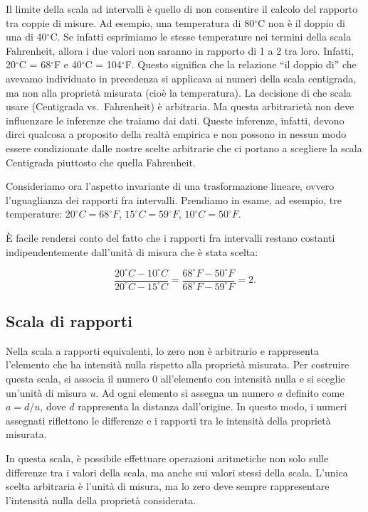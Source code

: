 \documentclass[
  letterpaper,
  krantz2]{{[}./krantz{]}}
\begin{document}
Il limite della scala ad intervalli è quello di non consentire il
calcolo del rapporto tra coppie di misure. Ad esempio, una temperatura
di 80\(^\circ\)C non è il doppio di una di 40\(^\circ\)C. Se infatti
esprimiamo le stesse temperature nei termini della scala Fahrenheit,
allora i due valori non saranno in rapporto di 1 a 2 tra loro. Infatti,
20\(^\circ\)C = 68\(^\circ\)F e 40\(^\circ\)C = 104\(^\circ\)F. Questo
significa che la relazione ``il doppio di'' che avevamo individuato in
precedenza si applicava ai numeri della scala centigrada, ma non alla
proprietà misurata (cioè la temperatura). La decisione di che scala
usare (Centigrada vs.~Fahrenheit) è arbitraria. Ma questa arbitrarietà
non deve influenzare le inferenze che traiamo dai dati. Queste
inferenze, infatti, devono dirci qualcosa a proposito della realtà
empirica e non possono in nessun modo essere condizionate dalle nostre
scelte arbitrarie che ci portano a scegliere la scala Centigrada
piuttosto che quella Fahrenheit.

Consideriamo ora l'aspetto invariante di una trasformazione lineare,
ovvero l'uguaglianza dei rapporti fra intervalli. Prendiamo in esame, ad
esempio, tre temperature: \(20^\circ C = 68^\circ F\),
\(15^\circ C = 59^\circ F\), \(10^\circ C = 50 ^\circ F\).

È facile rendersi conto del fatto che i rapporti fra intervalli restano
costanti indipendentemente dall'unità di misura che è stata scelta:

\[
  \frac{20^\circ C - 10^\circ C}{20^\circ C - 15^\circ C} =
  \frac{68^\circ F - 50^\circ F}{68^\circ F-59^\circ F} = 2.
\]

\subsection{Scala di rapporti}\label{scala-di-rapporti}

Nella scala a rapporti equivalenti, lo zero non è arbitrario e
rappresenta l'elemento che ha intensità nulla rispetto alla proprietà
misurata. Per costruire questa scala, si associa il numero 0
all'elemento con intensità nulla e si sceglie un'unità di misura \(u\).
Ad ogni elemento si assegna un numero \(a\) definito come \(a=d/u\),
dove \(d\) rappresenta la distanza dall'origine. In questo modo, i
numeri assegnati riflettono le differenze e i rapporti tra le intensità
della proprietà misurata.

In questa scala, è possibile effettuare operazioni aritmetiche non solo
sulle differenze tra i valori della scala, ma anche sui valori stessi
della scala. L'unica scelta arbitraria è l'unità di misura, ma lo zero
deve sempre rappresentare l'intensità nulla della proprietà considerata.
\end{document}
